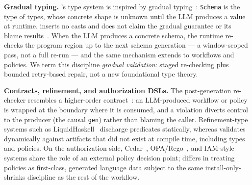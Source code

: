 \textbf{Gradual typing.} \pact{}'s type system is inspired by gradual typing~\cite{siek2006gradual,siek2015refined}: \texttt{Schema} is the type of types, whose concrete shape is unknown until the LLM produces a value at runtime. \pact{} inserts no casts and does not claim the gradual guarantee or its blame results~\cite{siek2015refined}. When the LLM produces a concrete schema, the runtime re-checks the program region up to the next schema generation --- a window-scoped pass, not a full re-run --- and the same mechanism extends to workflows and policies. We term this discipline \emph{gradual validation}: staged re-checking plus bounded retry-based repair, not a new foundational type theory.

\textbf{Contracts, refinement, and authorization DSLs.} The post-generation re-checker resembles a higher-order contract~\cite{findler2002contracts}: an LLM-produced workflow or policy is wrapped at the boundary where it is consumed, and a violation diverts control to the producer (the causal \texttt{gen}) rather than blaming the caller. Refinement-type systems such as LiquidHaskell~\cite{vazou2014liquidhaskell} discharge predicates statically, whereas \pact{} validates dynamically against artifacts that did not exist at compile time, including types and policies. On the authorization side, Cedar~\cite{cutler2024cedar}, OPA/Rego~\cite{opa2024}, and IAM-style systems share the role of an external policy decision point; \pact{} differs in treating policies as first-class, generated language data subject to the same install-only-shrinks discipline as the rest of the workflow.
